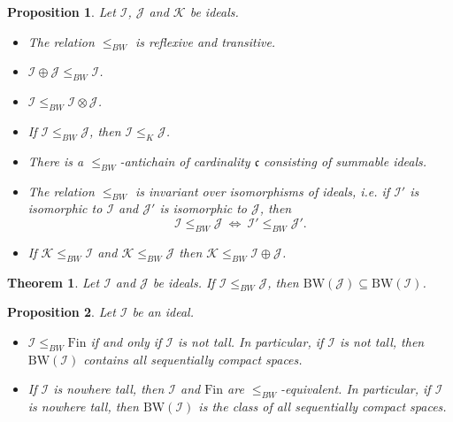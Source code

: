 \documentclass[10pt,a4paper]{amsart}
\newtheorem{proposition}{Proposition}
\newtheorem{theorem}{Theorem}
\newcommand{\BW}{\mathrm{BW}}
\newcommand{\Fin}{\mathrm{Fin}}
\newcommand{\I}{\cI}
\newcommand{\J}{\cJ}
\newcommand{\cI}{\mathcal{I}}
\newcommand{\cJ}{\mathcal{J}}
\newcommand{\cc}{\mathfrak{c}}
\begin{document}
\begin{proposition}
\label{prop:basic-properties}
Let $\I$, $\J$ and $\mathcal{K}$ be ideals.
\begin{itemize}
    \item[(a)] The relation $\leq_{BW}$ is reflexive and transitive.
    \item[(b)] $\I\oplus\J\leq_{BW}\I$.
    \item[(c)] $\I\leq_{BW}\I \otimes \J$.
    \item[(d)] If $\I\leq_{BW}\J$, then $\I\leq_{K}\J$.
    \item[(e)] There is a $\leq_{BW}$-antichain of cardinality $\cc$ consisting of summable ideals.
    \item[(f)] The relation $\leq_{BW}$ is invariant over isomorphisms of ideals, i.e. if $\I'$ is isomorphic to $\I$ and $\J'$ is isomorphic to $\J$, then
    \[
    \I\leq_{BW}\J\ \iff\ \I'\leq_{BW}\J'.
    \]
    \item[(g)] If $\mathcal{K}\leq_{BW}\I$ and $\mathcal{K}\leq_{BW}\J$ then $\mathcal{K}\leq_{BW}\I \oplus \J$.
\end{itemize}
\end{proposition}

\begin{theorem}
\label{thm:zawieranieBW}
Let $\I$ and $\J$ be ideals. If $\I\leq_{BW}\J$, then $\BW(\J)\subseteq\BW(\I)$.
\end{theorem}

\begin{proposition}
\label{prop:Fin_vs_tall}
Let $\I$ be an ideal.
\begin{itemize}
    \item[(a)] $\I\leq_{BW}\Fin$ if and only if $\I$ is not tall. In particular, if $\I$ is not tall, then $\BW(\I)$ contains all sequentially compact spaces. 
    \item[(b)] If $\I$ is nowhere tall, then $\I$ and $\Fin$ are $\leq_{BW}$-equivalent. In particular, if $\I$ is nowhere tall, then $\BW(\I)$ is the class of all sequentially compact spaces.
\end{itemize}
\end{proposition}
\end{document}
